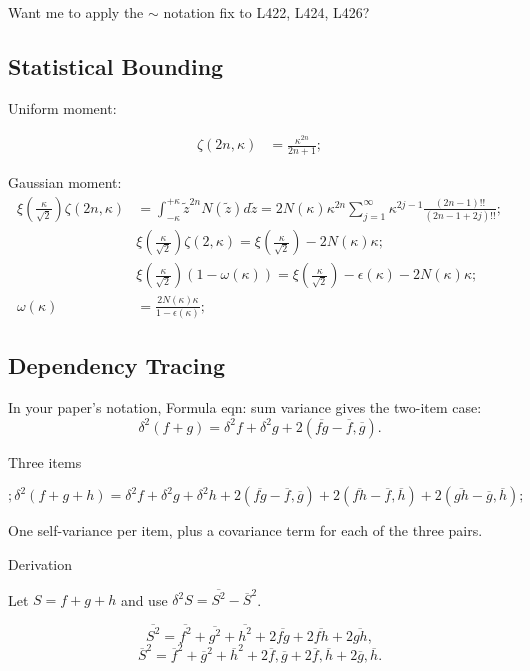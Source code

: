 \documentclass[twoside]{article}
\numberwithin{equation}{section}
\begin{document}
Want me to apply the $\sim$ notation fix to L422, L424, L426?


\subsection{Statistical Bounding}

Uniform moment:

\begin{align*}
\zeta(2n, \kappa) &= \frac{\kappa^{2n}}{2n + 1};
\end{align*}


Gaussian moment:
\begin{align*}
\xi(\frac{\kappa}{\sqrt{2}}) \zeta(2n, \kappa) &= \int_{-\kappa}^{+\kappa} \tilde{z}^{2n} N(\tilde{z}) d \tilde{z}
		= 2 N(\kappa) \kappa^{2n} \sum_{j=1}^{\infty} \kappa^{2j-1} \frac{(2n - 1)!!}{(2n-1 + 2j)!!}; \\
	& \xi(\frac{\kappa}{\sqrt{2}}) \zeta(2, \kappa) = \xi(\frac{\kappa}{\sqrt{2}}) - 2 N(\kappa) \kappa; \\
	& \xi(\frac{\kappa}{\sqrt{2}}) (1 - \omega(\kappa)) = \xi(\frac{\kappa}{\sqrt{2}}) - \epsilon(\kappa) - 2 N(\kappa) \kappa; \\
	\omega(\kappa) &= \frac{2 N(\kappa) \kappa}{1 - \epsilon(\kappa)};
\end{align*}

\subsection{Dependency Tracing}

\iffalse
In your paper's notation, Formula eqn: sum variance gives the two-item case:
$$\delta^2(f+g) = \delta^2 f + \delta^2 g + 2(\overline{fg} - \overline{f},\overline{g}).$$

Three items

$$\boxed{;\delta^2(f+g+h) = \delta^2 f + \delta^2 g + \delta^2 h + 2(\overline{fg}-\overline{f},\overline{g}) + 2(\overline{fh}-\overline{f},\overline{h}) + 2(\overline{gh}-\overline{g},\overline{h});}$$

One self-variance per item, plus a covariance term for each of the three pairs.

Derivation

Let $S=f+g+h$ and use $\delta^2 S = \overline{S^2}-\overline{S}^2$.

$$\overline{S^2} = \overline{f^2}+\overline{g^2}+\overline{h^2} + 2\overline{fg}+2\overline{fh}+2\overline{gh},$$
$$\overline{S}^2 = \overline{f}^2+\overline{g}^2+\overline{h}^2 + 2\overline{f},\overline{g}+2\overline{f},\overline{h}+2\overline{g},\overline{h}.$$
\end{document}
